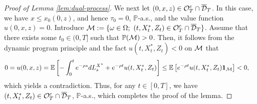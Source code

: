 \documentclass[11pt,times,letter]{article}
\newcommand{\Px}{ \mathbb{P} }
\newcommand{\Ex}{ \mathbb{E} }
\numberwithin{equation}{section}
\begin{document}
\begin{proof}[Proof of Lemma \ref{lem:dual-process}]
We next let $(0,x,z)\in {\cal O}_T^c\cap \overline{\mathcal{D}}_T$. In this case, we have $x\leq x_0(0,z)$, and hence $\tau_0=0$, $\Px$-a.s., and the value function  $u(0,x,z)=0$. Introduce ${\cal M}:=\{\omega\in\Omega;~(t,X_t^*,Z_t)\in  {\cal O}_T^c\cap \overline{\mathcal{D}}_T\}$. Assume that there exists some $t_0\in(0,T]$ such that $\Px({\cal M})>0$. Then, it follows from the dynamic program principle and the fact $u(t,X_t^*,Z_t)<0$ on ${\cal M}$ that
\begin{align*}
0=u(0,x,z)&=\Ex\left[-\int_0^{t}e^{-\rho s}dL_s^{X^*}+e^{-\rho t}u(t,X_t^*,Z_t)\right]\leq\Ex\left[e^{-\rho t}u(t,X_t^*,Z_t){\bf 1}_{{\cal M}}\right]<0,
\end{align*}
which yields a contradiction. Thus, for any $t\in[0,T]$, we have $(t,X_t^*,Z_t)\in  {\cal O}_T^c\cap \overline{\mathcal{D}}_T$, $\Px$-a.s., which completes the proof of the lemma.
\end{proof}
\end{document}
